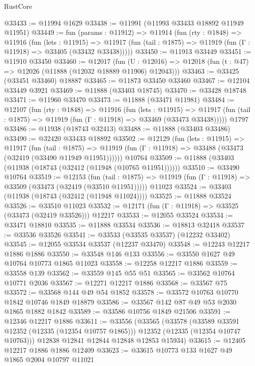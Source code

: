 \begin{lexlean}{RustCore}
\begin{coremodule}
@33433 := @11994 @1629
@33438 := @11991 (@11993 @33433 @18892 @11949 @11951)
@33449 := fun (params : @11912) =>
  @11914
    (fun (rty : @1848) =>
    @11916
      (fun (lets : @11915) =>
      @11917 (fun (tail : @1875) => @11919 (fun (Γ : @11918) => @33405 (@33432 @33438)))))
@33450 := @11913 @33449
@33451 := @11910 @33450
@33460 := @12017
    (fun (U : @12016) => @12018 (fun (t : @47) => @12026 (@11888 (@12032 @18889 @11906) @12043)))
@33463 := @33425 (@33451 @33460) @18887
@33465 := @11873 @33450 @33460
@33467 := @12104 @33449 @3921
@33469 := @11888 (@33403 @18745)
@33470 := @33428 @18748
@33471 := @11960 @33470
@33473 := @11888 (@33471 @11981)
@33484 := @12107
    (fun (rty : @1848) =>
    @11916
      (fun (lets : @11915) =>
      @11917 (fun (tail : @1875) => @11919 (fun (Γ : @11918) => @33469 (@33473 @33438)))))
    @1797
@33486 := @11938 (@18743 @32413)
@33488 := @11888 (@33403 @33486)
@33490 := @32420 @33433 @18892
@33502 := @12129
    (fun (lets : @11915) =>
    @11917
      (fun (tail : @1875) =>
      @11919 (fun (Γ : @11918) => @33488 (@33473 (@32419 (@33490 @11949 @11951))))))
    @10764
@33509 := @11888 (@33403 (@11938 (@18743 (@32412 (@11948 (@10765 @11951))))))
@33510 := @33490 @10764
@33519 := @12153
    (fun (tail : @1875) => @11919 (fun (Γ : @11918) => @33509 (@33473 (@32419 (@33510 @11951)))))
    @11023
@33524 := @33403 (@11938 (@18743 (@32412 (@11948 @11024))))
@33525 := @11888 @33524
@33526 := @33510 @11023
@33532 := @12171 (fun (Γ : @11918) => @33525 (@33473 (@32419 @33526))) @12217
@33533 := @12055 @33524
@33534 := @33471 @18810
@33535 := @11888 @33534
@33536 := @18813 @32418
@33537 := @33536 @33526
@33541 := @33533 (@33535 @33537) (@12232 @33402)
@33545 := @12055 @33534 @33537 (@12237 @33470)
@33548 := @12243 @12217 @1886 @1886
@33550 := @33548 @146 @133
@33556 := @33550 @1627 @49 @10764 @10773 @1865 @11023
@33558 := @12258 @12217 @1886
@33559 := @33558 @139
@33562 := @33559 @145 @55 @51
@33565 := @33562 @10764 @10771 @2036
@33567 := @12271 @12217 @1886
@33568 := @33567 @75
@33572 := @33568 @144 @49 @54 @1852
@33578 := @33572 @10763 @10770 @1842 @10746 @1849 @18879
@33586 := @33567 @142 @87 @49 @53 @2030 @1865 @1882 @1842
@33589 := @33586 @10756 @1849 @21506
@33591 := @12346 @12217 @1886
@33611 := @33556
    (@33565
      (@33578
        (@33589 @33591 @12352 (@12335 (@12354 @10757 @1865)))
        @12352
        (@12335 (@12354 @10747 @10763)))
      @12838
      @12841
      @12844
      @12848
      @12853
      @15934)
@33615 := @12405 @12217 @1886 @1886 @12409
@33623 := @33615 @10773 @133 @1627 @49 @1865 @2004 @10797 @11021

\end{coremodule}
\end{lexlean}
